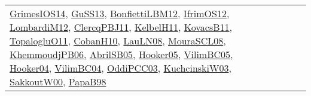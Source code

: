 {\begin{longtable}{llp{6cm}p{6cm}p{6cm}}
\href{articles/GrimesIOS14.pdf}{GrimesIOS14}\cite{GrimesIOS14}, \href{papers/GuSS13.pdf}{GuSS13}\cite{GuSS13}, \href{papers/BonfiettiLBM12.pdf}{BonfiettiLBM12}\cite{BonfiettiLBM12}, \href{papers/IfrimOS12.pdf}{IfrimOS12}\cite{IfrimOS12}, \href{articles/LombardiM12.pdf}{LombardiM12}\cite{LombardiM12}, \href{papers/ClercqPBJ11.pdf}{ClercqPBJ11}\cite{ClercqPBJ11}, \href{articles/KelbelH11.pdf}{KelbelH11}\cite{KelbelH11}, \href{articles/KovacsB11.pdf}{KovacsB11}\cite{KovacsB11}, \href{articles/TopalogluO11.pdf}{TopalogluO11}\cite{TopalogluO11}, \href{papers/CobanH10.pdf}{CobanH10}\cite{CobanH10}, \href{papers/LauLN08.pdf}{LauLN08}\cite{LauLN08}, \href{papers/MouraSCL08.pdf}{MouraSCL08}\cite{MouraSCL08}, \href{papers/KhemmoudjPB06.pdf}{KhemmoudjPB06}\cite{KhemmoudjPB06}, \href{papers/AbrilSB05.pdf}{AbrilSB05}\cite{AbrilSB05}, \href{articles/Hooker05.pdf}{Hooker05}\cite{Hooker05}, \href{articles/VilimBC05.pdf}{VilimBC05}\cite{VilimBC05}, \href{papers/Hooker04.pdf}{Hooker04}\cite{Hooker04}, \href{papers/VilimBC04.pdf}{VilimBC04}\cite{VilimBC04}, \href{papers/OddiPCC03.pdf}{OddiPCC03}\cite{OddiPCC03}, \href{articles/KuchcinskiW03.pdf}{KuchcinskiW03}\cite{KuchcinskiW03}, \href{articles/SakkoutW00.pdf}{SakkoutW00}\cite{SakkoutW00}, \href{articles/PapaB98.pdf}{PapaB98}\cite{PapaB98}\\

\end{longtable}}
